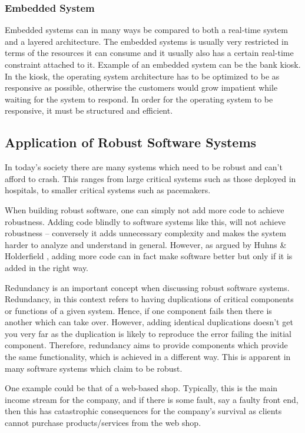   \subsubsection{Embedded System}
    Embedded systems can in many ways be compared to both a real-time system and a layered architecture. The embedded systems is usually very restricted in terms of the resources it can consume and it usually also has a certain real-time constraint attached to it. Example of an  embedded system can be the bank kiosk. In the kiosk, the operating system architecture has to be optimized to be as responsive as possible, otherwise the customers would grow impatient while waiting for the system to respond. In order for the operating system to be responsive, it must be structured and efficient. 

\subsection{Application of Robust Software Systems}

  In today's society there are many systems which need to be robust and can't afford to crash. This ranges from large critical systems such as those deployed in hospitals, to smaller critical systems such as pacemakers.

  When building robust software, one can simply not add more code to achieve robustness.  Adding code blindly to software systems like this, will not achieve robustness – conversely it adds unnecessary complexity and makes the system harder to analyze and understand in general. However, as argued by Huhns \& Holderfield \cite{huhns2002robust}, adding more code can in fact make software better but only if it is added in the right way.

  Redundancy is an important concept when discussing robust software systems. Redundancy, in this context refers to having duplications of critical components or functions of a given system. Hence, if one component fails then there is another which can take over. However, adding identical duplications doesn't get you very far as the duplication is likely to reproduce the error failing the initial component. Therefore, redundancy aims to provide components which provide the same functionality, which is achieved in a different way.  This is apparent in many software systems which claim to be robust.

  One example could be that of a web-based shop. Typically, this is the main income stream for the company, and if there is some fault, say a faulty front end, then this has catastrophic consequences for the company's survival as clients cannot purchase products/services from the web shop.

